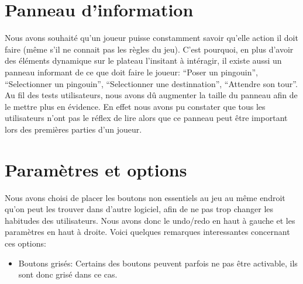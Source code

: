 \documentclass{report}
\begin{document}
\section{Panneau d'information}
Nous avons souhaité qu'un joueur puisse constamment savoir qu'elle action il doit faire (même s'il ne connait pas les règles du jeu). C'est pourquoi, en plus d'avoir des éléments dynamique sur le plateau l'insitant à intéragir, il existe aussi un panneau informant de ce que doit faire le joueur: ``Poser un pingouin'', ``Selectionner un pingouin'', ``Selectionner une destinnation'', ``Attendre son tour''. Au fil des tests utilisateurs, nous avons dû augmenter la taille du panneau afin de le mettre plus en évidence. En effet nous avons pu constater que tous les utilisateurs n'ont pas le réflex de lire alors que ce panneau peut être important lors des premières parties d'un joueur.

\section{Paramètres et options}
Nous avons choisi de placer les boutons non essentiels au jeu au même endroit qu'on peut les trouver dans d'autre logiciel, afin de ne pas trop changer les habitudes des utilisateurs. Nous avons donc le undo/redo en haut à gauche et les paramètres en haut à droite. Voici quelques remarques interessantes concernant ces options:

\begin{itemize}
\item Boutons grisés: Certains des boutons peuvent parfois ne pas être activable, ils sont donc grisé dans ce cas.


\end{itemize}
\end{document}
